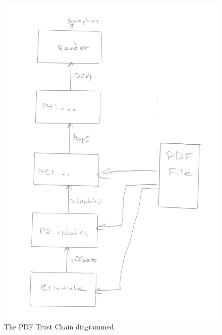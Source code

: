 \begin{figure}[t]
    \centering
    \includegraphics[width=0.8\linewidth]{figures/trustchain-diagram.png}
    \caption{The PDF Trust Chain diagrammed.}
    \label{fig:pdf-trust-chain}
\end{figure}

